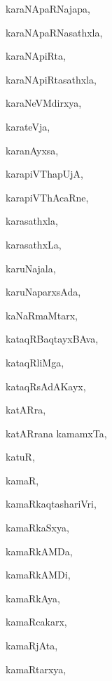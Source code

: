 \begin{multicols}{3}
{\noindent
{karaNApaRNajapa}, \pageref{karaNApaRNajapa}

\noindent
{karaNApaRNasathxla}, \pageref{karaNApaRNasathxla}

\noindent
{karaNApiRta}, \pageref{karaNApiRta}

\noindent
{karaNApiRtasathxla}, \pageref{karaNApiRtasathxla}

\noindent
{karaNeVMdirxya}, \pageref{karaNeVMdirxya}

\noindent
{karateVja}, \pageref{karateVja}

\noindent
{karanAyxsa}, \pageref{karanAyxsa}

\noindent
{karapiVThapUjA}, \pageref{karapiVThapUjA}

\noindent
{karapiVThAcaRne}, \pageref{karapiVThAcaRne}

\noindent
{karasathxla}, \pageref{karasathxla}

\noindent
{karasathxLa}, \pageref{karasathxLa}

\noindent
{karuNajala}, \pageref{karuNajala}

\noindent
{karuNaparxsAda}, \pageref{karuNaparxsAda}

\noindent
{kaNaRmaMtarx}, \pageref{kaNaRmaMtarx}

\noindent
{kataqRBaqtayxBAva}, \pageref{kataqRBaqtayxBAva}

\noindent
{kataqRliMga}, \pageref{kataqRliMga}

\noindent
{kataqRsAdAKayx}, \pageref{kataqRsAdAKayx}

\noindent
{katARra}, \pageref{katARra}

\noindent
{katARrana kamamxTa}, \pageref{katARrana kamamxTa}

\noindent
{katuR}, \pageref{katuR}

\noindent
{kamaR}, \pageref{kamaR}

\noindent
{kamaRkaqtashariVri}, \pageref{kamaRkaqtashariVri}

\noindent
{kamaRkaSxya}, \pageref{kamaRkaSxya}

\noindent
{kamaRkAMDa}, \pageref{kamaRkAMDa}

\noindent
{kamaRkAMDi}, \pageref{kamaRkAMDi}

\noindent
{kamaRkAya}, \pageref{kamaRkAya}

\noindent
{kamaRcakarx}, \pageref{kamaRcakarx}

\noindent
{kamaRjAta}, \pageref{kamaRjAta}

\noindent
{kamaRtarxya}, \pageref{kamaRtarxya}

}
\end{multicols}
